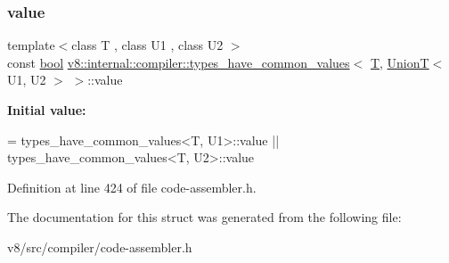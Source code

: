 \subsubsection{\texorpdfstring{value}{value}}
{\footnotesize\ttfamily template$<$class T , class U1 , class U2 $>$ \\
const \mbox{\hyperlink{classbool}{bool}} \mbox{\hyperlink{structv8_1_1internal_1_1compiler_1_1types__have__common__values}{v8\+::internal\+::compiler\+::types\+\_\+have\+\_\+common\+\_\+values}}$<$ \mbox{\hyperlink{classv8_1_1internal_1_1torque_1_1T}{T}}, \mbox{\hyperlink{structv8_1_1internal_1_1UnionT}{UnionT}}$<$ U1, U2 $>$ $>$\+::value\hspace{0.3cm}{\ttfamily [static]}}

{\bfseries Initial value\+:}
\begin{DoxyCode}
= types\_have\_common\_values<T, U1>::value ||
                            types\_have\_common\_values<T, U2>::value
\end{DoxyCode}


Definition at line 424 of file code-\/assembler.\+h.



The documentation for this struct was generated from the following file\+:\begin{DoxyCompactItemize}
\item 
v8/src/compiler/code-\/assembler.\+h\end{DoxyCompactItemize}
